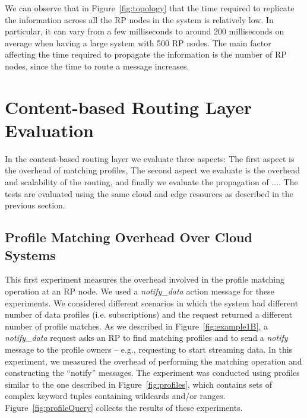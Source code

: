 We can observe that in Figure~\ref{fig:topology} that the time required to replicate the information across all the RP nodes in the system is relatively low. In particular, it can vary from a few milliseconds to around 200 milliseconds on average when having a large system with 500 RP nodes. The main factor affecting the time required to propagate the information is the number of RP nodes, since the time to route a message increases. 

\section{Content-based Routing Layer Evaluation}

In the content-based routing layer we evaluate three aspects: The first aspect is the overhead of matching profiles, The second aspect we evaluate is the overhead and scalability of the routing, and finally we evaluate the propagation of ....  The tests are evaluated using the same cloud and edge resources as described in the previous section.

\subsection{Profile Matching Overhead Over Cloud Systems}

This first experiment measures the overhead involved in the profile matching operation at an RP node. We used a {\it notify\_data} action message for these experiments. We considered different scenarios in which the system had different number of data profiles (i.e. subscriptions) and the request returned a different number of profile matches. As we described in Figure~\ref{fig:example1B}, a {\it notify\_data} request asks an RP to find matching profiles and to send a {\it notify} message to the profile owners -- e.g., requesting to start streaming data. In this experiment, we measured the overhead of performing the matching operation and constructing the ``notify'' messages.  The experiment was conducted using profiles similar to the one described in Figure~\ref{fig:profiles}, which contains sets of complex keyword tuples containing wildcards and/or ranges. Figure~\ref{fig:profileQuery} collects the results of these experiments. 

